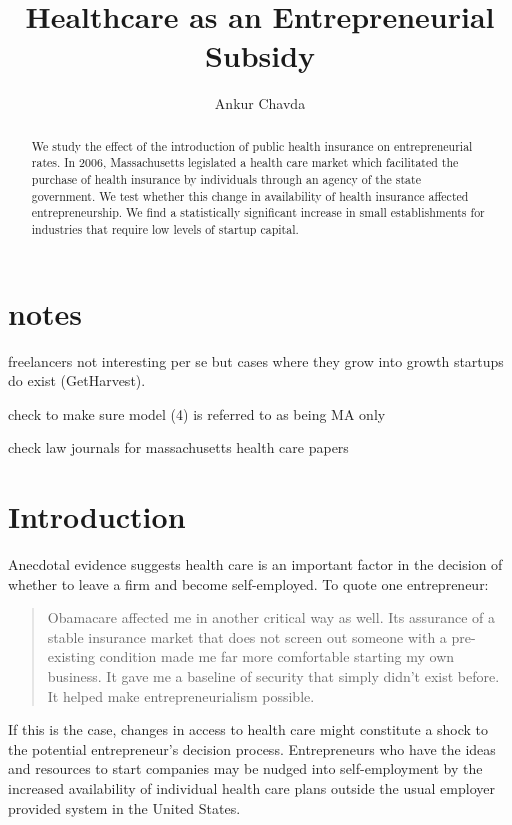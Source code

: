 \documentclass[12pt]{article}
\title{Healthcare as an Entrepreneurial Subsidy}
\author{Ankur Chavda}
\begin{document}
\maketitle

\begin{abstract}
We study the effect of the introduction of public health insurance on entrepreneurial rates. In 2006, Massachusetts legislated a health care market which facilitated the purchase of health insurance by individuals through an agency of the state government. We test whether this change in availability of health insurance affected entrepreneurship. We find a statistically significant increase in small establishments for industries that require low levels of startup capital.
\end{abstract}

\section{notes}

freelancers not interesting per se but cases where they grow into growth startups do exist (GetHarvest). 

check to make sure model (4) is referred to as being MA only

check law journals for massachusetts health care papers

\section{Introduction}

Anecdotal evidence suggests health care is an important factor in the decision of whether to leave a firm and become self-employed. To quote one entrepreneur: 
\begin{quote}
Obamacare affected me in another critical way as well. Its assurance of a stable insurance market that does not screen out someone with a pre-existing condition made me far more comfortable starting my own business. It gave me a baseline of security that simply didn't exist before. It helped make entrepreneurialism possible. \cite{sullivan}
\end{quote}
If this is the case, changes in access to health care might constitute a shock to the potential entrepreneur's decision process. Entrepreneurs who have the ideas and resources to start companies may be nudged into self-employment by the increased availability of individual health care plans outside the usual employer provided system in the United States. 
\end{document}
